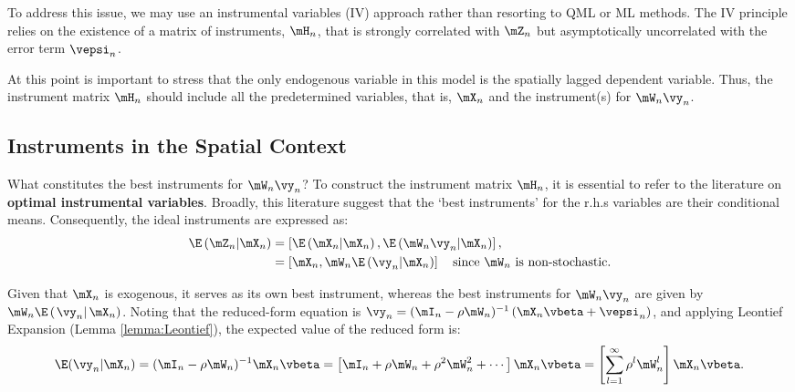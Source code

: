 \documentclass[english,12pt]{book}\usepackage[]{graphicx}\usepackage[]{xcolor}
\begin{document}
To address this issue, we may use an instrumental variables (IV) approach rather than resorting to QML or ML methods. The IV principle relies on the existence of a matrix of instruments, $\mH_n$, that is strongly correlated with $\mZ_n$ but asymptotically uncorrelated with the error term $\vepsi_n$.

At this point is important to stress that the only endogenous variable in this model is the spatially lagged dependent variable. Thus, the instrument  matrix $\mH_n$ should include all the predetermined variables, that is, $\mX_n$ and the instrument(s) for $\mW_n\vy_n$. 

\subsection{Instruments in the Spatial Context}

What constitutes the best instruments for $\mW_n\vy_n$? To construct the instrument matrix $\mH_n$, it is essential to refer to the literature on \textbf{optimal instrumental variables}. Broadly, this literature suggest that the `best instruments' for the r.h.s variables are their conditional means. Consequently, the ideal instruments are expressed as:
\begin{equation*}
  \begin{aligned}
\E\left(\mZ_n|\mX_n\right) & = \left[\E\left(\mX_n|\mX_n\right), \E\left(\mW_n\vy_n|\mX_n\right)\right], \\
                         & = \left[\mX_n, \mW_n \E\left(\vy_n|\mX_n\right)\right]\quad \mbox{since $\mW_n$ is non-stochastic}.
\end{aligned}
\end{equation*}

Given that $\mX_n$ is exogenous, it serves as its own best instrument, whereas the best instruments for $\mW_n\vy_n$ are given by $\mW_n\E\left(\left.\vy_n\right|\mX_n\right)$. Noting that the reduced-form equation is $\vy_n = (\mI_n - \rho\mW_n)^{-1}\left(\mX_n\vbeta + \vepsi_n \right)$, and applying Leontief Expansion (Lemma \ref{lemma:Leontief}), the expected value of the reduced form is:
\begin{equation}\label{eq:exp_instr}
  \E(\vy_n|\mX_n) = (\mI_n - \rho\mW_n)^{-1}\mX_n\vbeta = \left[\mI_n + \rho\mW_n + \rho^2\mW_n^2 + \cdots \right]\mX_n\vbeta = \left[\sum_{l = 1}^{\infty}\rho^{l}\mW^l_n\right]\mX_n\vbeta.
\end{equation}
\end{document}
